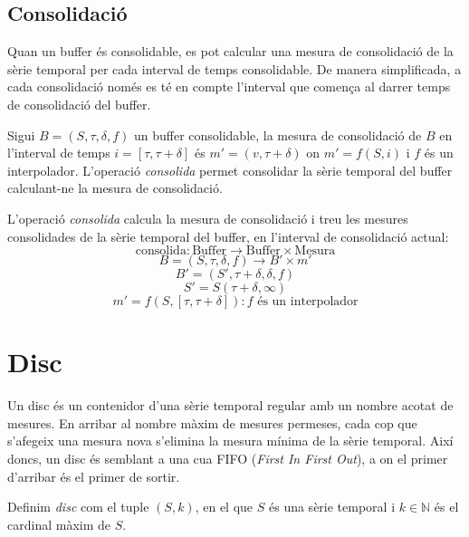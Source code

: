 


\subsection{Consolidació}

Quan un buffer és consolidable, es pot calcular una mesura de consolidació de la sèrie temporal per cada interval de temps consolidable. De manera simplificada, a cada consolidació només es té en compte l'interval que comença al darrer temps de consolidació del buffer. 

Sigui $B=(S,\tau,\delta,f)$ un buffer consolidable, la mesura de consolidació de $B$ en l'interval de temps $i=[\tau,\tau+\delta]$ és $m'=(v,\tau+\delta)$ on $m'=f(S,i)$ i $f$ és un interpolador. L'operació \emph{consolida} permet consolidar la sèrie temporal del buffer calculant-ne la mesura de consolidació.

\begin{definition}
  L'operació \emph{consolida} calcula la mesura de consolidació i treu
  les mesures consolidades de la sèrie temporal del buffer, en
  l'interval de consolidació actual:
  \[
  \text{consolida}: \text{Buffer} \longrightarrow \text{Buffer} \times \text{Mesura}
  \]
  \[
  B=(S,\tau,\delta,f) \longrightarrow B' \times m'
  \]
  \[
  B'= (S',\tau+\delta,\delta,f)
  \]
  \[
  S' = S(\tau+\delta,\infty)
  \]
  \[
  m' = f(S,[\tau,\tau+\delta]): f \text{ és un interpolador}
  \]
\end{definition}



\section{Disc}\label{sec:model:disc}

Un disc és un contenidor d'una sèrie temporal regular amb un nombre acotat de mesures. En arribar al nombre màxim de mesures permeses, cada cop que s'afegeix una mesura nova s'elimina la mesura mínima de la sèrie temporal.
Així doncs, un disc és semblant a una cua FIFO (\emph{First In First Out}), a on el primer d'arribar és el primer de sortir.  

\begin{definition}[Disc]
  Definim \emph{disc} com el tuple $(S,k)$, en el que $S$
  és una sèrie temporal i $k\in\mathbb{N}$ és el cardinal màxim de $S$.
\end{definition}

